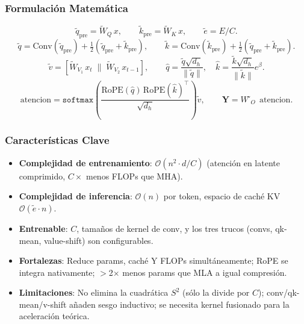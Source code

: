\subsubsection{Formulación Matemática}
\[
\tilde{q}_{\text{pre}} = \tilde{W}_Q\, x, \qquad \tilde{k}_{\text{pre}} = \tilde{W}_K\, x, \qquad \tilde{e} = E / C.
\]
\[
\tilde{q} = \text{Conv}(\tilde{q}_{\text{pre}}) + \tfrac{1}{2}(\tilde{q}_{\text{pre}} + \tilde{k}_{\text{pre}}), \qquad
\tilde{k} = \text{Conv}(\tilde{k}_{\text{pre}}) + \tfrac{1}{2}(\tilde{q}_{\text{pre}} + \tilde{k}_{\text{pre}}).
\]
\[
\tilde{v} = [\tilde{W}_{V_1}\, x_t \;\|\; \tilde{W}_{V_2}\, x_{t-1}], \qquad
\hat{q} = \frac{\tilde{q} \sqrt{d_h}}{\|\tilde{q}\|}, \quad \hat{k} = \frac{\tilde{k} \sqrt{d_h}}{\|\tilde{k}\|} e^{\beta}.
\]
\[
\text{atencion} = \texttt{softmax}\!\left(\frac{\text{RoPE}(\hat{q})\, \text{RoPE}(\hat{k})^\top}{\sqrt{d_h}}\right) \tilde{v}, \qquad
\mathbf{Y} = W̃_O\, \text{atencion}.
\]

\subsubsection{Características Clave}
\begin{itemize}[leftmargin=*]
    \item \textbf{Complejidad de entrenamiento}: $\mathcal{O}(n^2 \cdot d / C)$ (atención en latente comprimido, $C{\times}$ menos FLOPs que MHA).
    \item \textbf{Complejidad de inferencia}: $\mathcal{O}(n)$ por token, espacio de caché KV $\mathcal{O}(\tilde{e} \cdot n)$.
    \item \textbf{Entrenable}: $C$, tamaños de kernel de conv, y los tres trucos (convs, qk-mean, value-shift) son configurables.
    \item \textbf{Fortalezas}: Reduce params, caché Y FLOPs simultáneamente; RoPE se integra nativamente; $>$2$\times$ menos params que MLA a igual compresión.
    \item \textbf{Limitaciones}: No elimina la cuadrática $S^2$ (sólo la divide por $C$); conv/qk-mean/v-shift añaden sesgo inductivo; se necesita kernel fusionado para la aceleración teórica.
\end{itemize}

